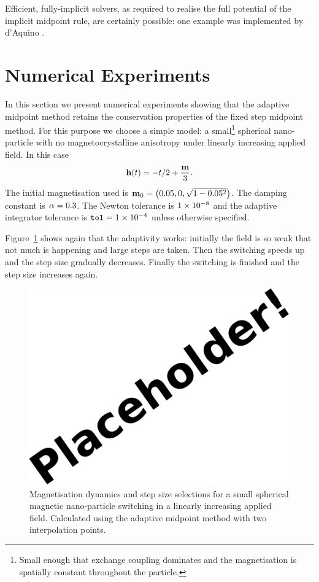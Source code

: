 Efficient, fully-implicit solvers, as required to realise the full potential of the implicit midpoint rule, are certainly possible: one example was implemented by d'Aquino \etal.\cite{DAquino2005}


\section{Numerical Experiments}

In this section we present numerical experiments showing that the adaptive midpoint method retains the conservation properties of the fixed step midpoint method.
For this purpose we choose a simple model: a small\footnote{Small enough that exchange coupling dominates and the magnetisation is spatially constant throughout the particle.} spherical nano-particle with no magnetocrystalline anisotropy under linearly increasing applied field.
In this case
\begin{equation}
  \mathbf{h}(t) = - t/2 +  \frac{\mathbf{m}}{3}.
\end{equation}
The initial magnetisation used is $\mathbf{m}_0 = \left( 0.05, 0, \sqrt{1 - 0.05^2} \right)$.
The damping constant is $\alpha = 0.3$.
The Newton tolerance is $1\times 10^{-8}$ and the adaptive integrator tolerance is ${\textrm{\textup{\texttt{tol}}}} = 1\times 10^{-4}$ unless otherwise specified.

Figure~\ref{fig:linear-field-switch-mp} shows again that the adaptivity works: initially the field is so weak that not much is happening and large steps are taken.
Then the switching speeds up and the step size gradually decreases.
Finally the switching is finished and the step size increases again.

\begin{figure}[ht!]
  \centering
  \includegraphics{images/placeholder}
  \caption{Magnetisation dynamics and step size selections for a small spherical magnetic nano-particle switching in a linearly increasing applied field. Calculated using the adaptive midpoint method with two interpolation points.}
  \label{fig:linear-field-switch-mp}
\end{figure}

